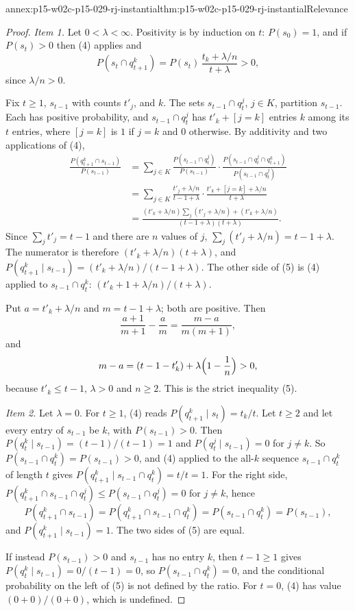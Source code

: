 \begin{annexitem}{annex:p15-w02c-p15-029-rj-instantial}{thm:p15-w02c-p15-029-rj-instantial}{Relevance}
\begin{proof}
\emph{Item 1.} Let \(0<\lambda<\infty\). Positivity is by induction on
\(t\): \(P(s_0)=1\), and if \(P(s_t)>0\) then (4) applies and
\[
 P(s_t\cap q^k_{t+1})=P(s_t)\,\frac{t_k+\lambda/n}{t+\lambda}>0,
\]
since \(\lambda/n>0\).

Fix \(t\ge1\), \(s_{t-1}\) with counts \(t'_j\), and \(k\). The sets
\(s_{t-1}\cap q^j_t\), \(j\in K\), partition \(s_{t-1}\). Each has
positive probability, and \(s_{t-1}\cap q^j_t\) has \(t'_k+[j=k]\)
entries \(k\) among its \(t\) entries, where \([j=k]\) is \(1\) if
\(j=k\) and \(0\) otherwise. By additivity and two applications of (4),
\begin{align*}
 \frac{P(q^k_{t+1}\cap s_{t-1})}{P(s_{t-1})}
 &=\sum_{j\in K}\frac{P(s_{t-1}\cap q^j_t)}{P(s_{t-1})}\cdot
   \frac{P(s_{t-1}\cap q^j_t\cap q^k_{t+1})}{P(s_{t-1}\cap q^j_t)}\\
 &=\sum_{j\in K}\frac{t'_j+\lambda/n}{t-1+\lambda}\cdot
   \frac{t'_k+[j=k]+\lambda/n}{t+\lambda}\\
 &=\frac{(t'_k+\lambda/n)\sum_{j}(t'_j+\lambda/n)+(t'_k+\lambda/n)}{(t-1+\lambda)(t+\lambda)} .
\end{align*}
Since \(\sum_j t'_j=t-1\) and there are \(n\) values of \(j\),
\(\sum_j(t'_j+\lambda/n)=t-1+\lambda\). The numerator is therefore
\((t'_k+\lambda/n)(t+\lambda)\), and
\(P(q^k_{t+1}\mid s_{t-1})=(t'_k+\lambda/n)/(t-1+\lambda)\). The other
side of (5) is (4) applied to \(s_{t-1}\cap q^k_t\):
\((t'_k+1+\lambda/n)/(t+\lambda)\).

Put \(a=t'_k+\lambda/n\) and \(m=t-1+\lambda\); both are positive. Then
\[
 \frac{a+1}{m+1}-\frac am=\frac{m-a}{m(m+1)},
\]
and
\[
 m-a=(t-1-t'_k)+\lambda\Bigl(1-\frac1n\Bigr)>0,
\]
because \(t'_k\le t-1\), \(\lambda>0\) and \(n\ge2\). This is the strict
inequality (5).

\emph{Item 2.} Let \(\lambda=0\). For \(t\ge1\), (4) reads
\(P(q^k_{t+1}\mid s_t)=t_k/t\). Let \(t\ge2\) and let every entry of
\(s_{t-1}\) be \(k\), with \(P(s_{t-1})>0\). Then
\(P(q^k_t\mid s_{t-1})=(t-1)/(t-1)=1\) and \(P(q^j_t\mid s_{t-1})=0\) for
\(j\ne k\). So \(P(s_{t-1}\cap q^k_t)=P(s_{t-1})>0\), and (4) applied to
the all-\(k\) sequence \(s_{t-1}\cap q^k_t\) of length \(t\) gives
\(P(q^k_{t+1}\mid s_{t-1}\cap q^k_t)=t/t=1\). For the right side,
\(P(q^k_{t+1}\cap s_{t-1}\cap q^j_t)\le P(s_{t-1}\cap q^j_t)=0\) for
\(j\ne k\), hence
\[
 P(q^k_{t+1}\cap s_{t-1})=P(q^k_{t+1}\cap s_{t-1}\cap q^k_t)=P(s_{t-1}\cap q^k_t)=P(s_{t-1}),
\]
and \(P(q^k_{t+1}\mid s_{t-1})=1\). The two sides of (5) are equal.

If instead \(P(s_{t-1})>0\) and \(s_{t-1}\) has no entry \(k\), then
\(t-1\ge1\) gives \(P(q^k_t\mid s_{t-1})=0/(t-1)=0\), so
\(P(s_{t-1}\cap q^k_t)=0\), and the conditional probability on the left
of (5) is not defined by the ratio. For \(t=0\), (4) has value
\((0+0)/(0+0)\), which is undefined.
\end{proof}
\end{annexitem}

